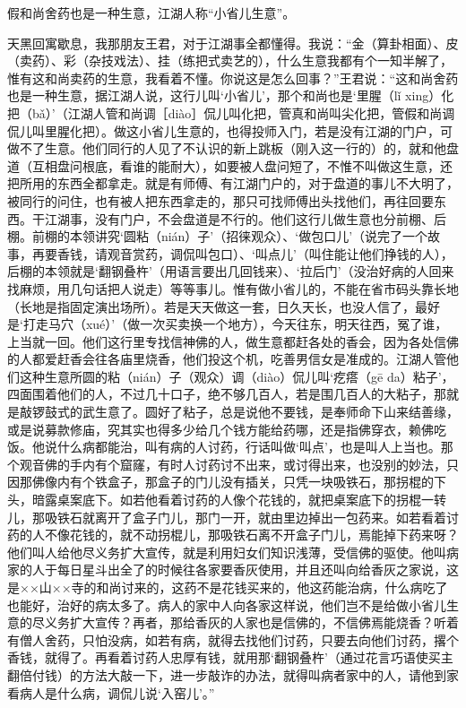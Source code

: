 \documentclass[12pt,UTF8]{ctexbook}
\begin{document}
假和尚舍药也是一种生意，江湖人称“小省儿生意”。



天黑回寓歇息，我那朋友王君，对于江湖事全都懂得。我说：“金（算卦相面）、皮（卖药）、彩（杂技戏法）、挂（练把式卖艺的），什么生意我都有个一知半解了，惟有这和尚卖药的生意，我看着不懂。你说这是怎么回事？”王君说：“这和尚舍药也是一种生意，据江湖人说，这行儿叫‘小省儿’，那个和尚也是‘里腥（lǐ xing）化把（bǎ）’（江湖人管和尚调［diào］侃儿叫化把，管真和尚叫尖化把，管假和尚调侃儿叫里腥化把）。做这小省儿生意的，也得投师入门，若是没有江湖的门户，可做不了生意。他们同行的人见了不认识的新上跳板（刚入这一行的）的，就和他盘道（互相盘问根底，看谁的能耐大），如要被人盘问短了，不惟不叫做这生意，还把所用的东西全都拿走。就是有师傅、有江湖门户的，对于盘道的事儿不大明了，被同行的问住，也有被人把东西拿走的，那只可找师傅出头找他们，再往回要东西。干江湖事，没有门户，不会盘道是不行的。他们这行儿做生意也分前棚、后棚。前棚的本领讲究‘圆粘（nián）子’（招徕观众）、‘做包口儿’（说完了一个故事，再要香钱，请观音赏药，调侃叫包口）、‘叫点儿’（叫住能让他们挣钱的人），后棚的本领就是‘翻钢叠杵’（用语言要出几回钱来）、‘拉后门’（没治好病的人回来找麻烦，用几句话把人说走）等等事儿。惟有做小省儿的，不能在省市码头靠长地（长地是指固定演出场所）。若是天天做这一套，日久天长，也没人信了，最好是‘打走马穴（xué）’（做一次买卖换一个地方），今天往东，明天往西，冤了谁，上当就一回。他们这行里专找信神佛的人，做生意都赶各处的香会，因为各处信佛的人都爱赶香会往各庙里烧香，他们投这个机，吃善男信女是准成的。江湖人管他们这种生意所圆的粘（nián）子（观众）调（diào）侃儿叫‘疙瘩（gē da）粘子’，四面围着他们的人，不过几十口子，绝不够几百人，若是围几百人的大粘子，那就是敲锣鼓式的武生意了。圆好了粘子，总是说他不要钱，是奉师命下山来结善缘，或是说募款修庙，究其实也得多少给几个钱方能给药哪，还是指佛穿衣，赖佛吃饭。他说什么病都能治，叫有病的人讨药，行话叫做‘叫点’，也是叫人上当也。那个观音佛的手内有个窟窿，有时人讨药讨不出来，或讨得出来，也没别的妙法，只因那佛像内有个铁盒子，那盒子的门儿没有插关，只凭一块吸铁石，那拐棍的下头，暗露桌案底下。如若他看着讨药的人像个花钱的，就把桌案底下的拐棍一转儿，那吸铁石就离开了盒子门儿，那门一开，就由里边掉出一包药来。如若看着讨药的人不像花钱的，就不动拐棍儿，那吸铁石离不开盒子门儿，焉能掉下药来呀？他们叫人给他尽义务扩大宣传，就是利用妇女们知识浅薄，受信佛的驱使。他叫病家的人于每日星斗出全了的时候往各家要香灰使用，并且还叫向给香灰之家说，这是××山××寺的和尚讨来的，这药不是花钱买来的，他这药能治病，什么病吃了也能好，治好的病太多了。病人的家中人向各家这样说，他们岂不是给做小省儿生意的尽义务扩大宣传？再者，那给香灰的人家也是信佛的，不信佛焉能烧香？听着有僧人舍药，只怕没病，如若有病，就得去找他们讨药，只要去向他们讨药，撂个香钱，就得了。再看着讨药人忠厚有钱，就用那‘翻钢叠杵’（通过花言巧语使买主翻倍付钱）的方法大敲一下，进一步敲诈的办法，就得叫病者家中的人，请他到家看病人是什么病，调侃儿说‘入窑儿’。”
\end{document}

